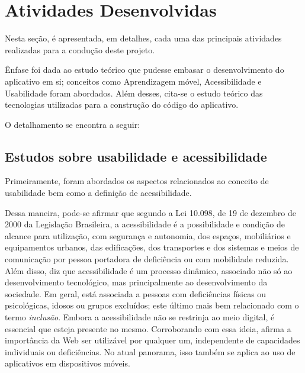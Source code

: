 \chapter{Atividades Desenvolvidas}\label{sec:ativ_desenvolvidas}
Nesta seção, é apresentada, em detalhes, cada uma das principais atividades realizadas para a condução deste projeto.

Ênfase foi dada ao estudo teórico que pudesse embasar o desenvolvimento do aplicativo em si; conceitos como Aprendizagem móvel, Acessibilidade e Usabilidade foram abordados. Além desses, cita-se o estudo teórico das tecnologias utilizadas para a construção do código do aplicativo.

O detalhamento se encontra a seguir:

\section{Estudos sobre usabilidade e acessibilidade}\label{sec:estudos_usab_acess} 



Primeiramente, foram abordados os aspectos relacionados ao conceito de usabilidade bem como a definição de acessibilidade. 

Dessa maneira, pode-se afirmar que segundo a Lei 10.098, de 19 de dezembro de 2000 da Legislação Brasileira, a acessibilidade é a possibilidade e condição de alcance para utilização, com segurança e autonomia, dos
espaços, mobiliários e equipamentos urbanos, das
edificações, dos transportes e dos sistemas e meios de comunicação por pessoa portadora de deficiência ou com mobilidade reduzida. Além disso, \cite{torres2002acessibilidade} diz que acessibilidade é um processo dinâmico, associado não só ao desenvolvimento tecnológico, mas principalmente ao desenvolvimento da sociedade. Em geral, está associada a pessoas com deficiências físicas ou psicológicas, idosos ou grupos excluídos; este último mais bem relacionado com o termo \textit{inclusão}. Embora a acessibilidade não se restrinja ao meio digital, é essencial que esteja presente no mesmo. Corroborando com essa ideia, \cite{leew3c} afirma a importância da Web ser utilizável por qualquer um, independente de capacidades individuais ou deficiências. No atual panorama, isso também se aplica ao uso de aplicativos em dispositivos móveis. 


